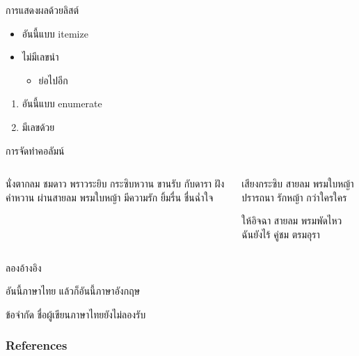 \documentclass[xetex,serif]{beamer}
\begin{document}
\begin{frame}{การแสดงผลด้วยลิสต์}
\begin{itemize}
	\item อันนี้แบบ itemize
	\item ไม่มีเลขนำ \begin{itemize}
	\item ย่อไปอีก
	\end{itemize}
\end{itemize}
	
\begin{enumerate}
	\item อันนี้แบบ enumerate
	\item มีเลขด้วย
\end{enumerate}
\end{frame}


\begin{frame}{การจัดทำคอลัมน์}

\begin{columns}
\begin{column}{0.5\textwidth}
นั่งตากลม ชมดาว พราวระยิบ
กระซิบหวาน ขานรับ กับดารา
\bigskip
ฝังคำหวาน ผ่านสายลม พรมใบหญ้า
มีความรัก ยิ้มรื่น ชื่นฉ่ำใจ



\end{column}
\begin{column}{0.5\textwidth}
เสียงกระซิบ สายลม พรมใบหญ้า
ปรารถนา รักหญ้า กว่าใครใคร

\bigskip

ให้อิจฉา สายลม พรมพัดไหว
ฉันยังไร้ คู่ชม ตรมอุรา


\end{column}
\end{columns}

	
\end{frame}

\begin{frame}{ลองอ้างอิง}

อันนี้ภาษาไทย \cite{phongpaichit1996} แล้วก็อันนี้ภาษาอังกฤษ \cite{4600388}

	\begin{alertblock}{ข้อจำกัด}
		ชื่อผู้เขียนภาษาไทยยังไม่ลองรับ
	\end{alertblock}	
\end{frame}


\begin{frame}[allowframebreaks]
        \frametitle{References}
        
        
\end{frame}
\end{document}
